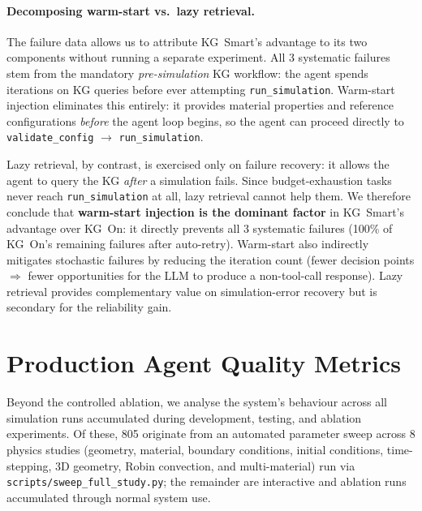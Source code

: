\documentclass[preprint,review,12pt]{elsarticle}
\begin{document}
\paragraph{Decomposing warm-start vs.\ lazy retrieval.}
The failure data allows us to attribute KG~Smart's advantage to its
two components without running a separate experiment.  All 3 systematic
failures stem from the mandatory \emph{pre-simulation} KG workflow:
the agent spends iterations on KG queries before ever attempting
\texttt{run\_simulation}.  Warm-start injection eliminates this
entirely: it provides material properties and reference configurations
\emph{before} the agent loop begins, so the agent can proceed directly
to \texttt{validate\_config} $\to$ \texttt{run\_simulation}.

Lazy retrieval, by contrast, is exercised only on failure recovery:
it allows the agent to query the KG \emph{after} a simulation fails.
Since budget-exhaustion tasks never reach \texttt{run\_simulation}
at all, lazy retrieval cannot help them.  We therefore conclude
that \textbf{warm-start injection is the dominant factor} in
KG~Smart's advantage over KG~On: it directly prevents all 3 systematic
failures (100\% of KG~On's remaining failures after auto-retry).
Warm-start also indirectly mitigates stochastic failures by reducing
the iteration count (fewer decision points $\Rightarrow$ fewer
opportunities for the LLM to produce a non-tool-call response).
Lazy retrieval provides complementary value on simulation-error
recovery but is secondary for the reliability gain.

\section{Production Agent Quality Metrics}
\label{sec:metrics}

Beyond the controlled ablation, we analyse the system's behaviour across all
simulation runs accumulated during development, testing, and ablation
experiments.  Of these, 805 originate from an automated parameter sweep across 8 physics
studies (geometry, material, boundary conditions, initial conditions,
time-stepping, 3D geometry, Robin convection, and multi-material) run via
\texttt{scripts/sweep\_full\_study.py}; the remainder are interactive and
ablation runs accumulated through normal system use.
\end{document}
